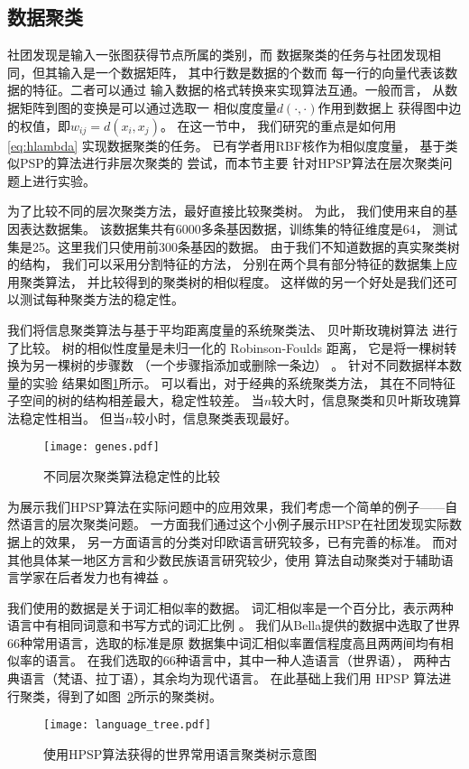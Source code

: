 \subsection{数据聚类}
\label{sec:data_clustering}
社团发现是输入一张图获得节点所属的类别，而
数据聚类的任务与社团发现相同，但其输入是一个数据矩阵，
其中行数是数据的个数而
每一行的向量代表该数据的特征。二者可以通过
输入数据的格式转换来实现算法互通。一般而言，
从数据矩阵到图的变换是可以通过选取一
相似度度量$d(\cdot,\cdot)$作用到数据上
获得图中边的权值，即$w_{ij}=d(x_i, x_j)$。
在这一节中，
我们研究的重点是如何用
\eqref{eq:hlambda} 实现数据聚类的任务。
已有学者用RBF核作为相似度度量，
基于类似PSP的算法进行非层次聚类的
尝试\cite{mac}，而本节主要
针对HPSP算法在层次聚类问题上进行实验。

为了比较不同的层次聚类方法，最好直接比较聚类树。
为此，
我们使用来自\citet{khan2001classification}的基因表达数据集。
该数据集共有6000多条基因数据，训练集的特征维度是64，
测试集是25。这里我们只使用前300条基因的数据。
由于我们不知道数据的真实聚类树的结构，
我们可以采用分割特征的方法，
分别在两个具有部分特征的数据集上应用聚类算法，
并比较得到的聚类树的相似程度。
这样做的另一个好处是我们还可以测试每种聚类方法的稳定性。

我们将信息聚类算法与基于平均距离度量的系统聚类法、
贝叶斯玫瑰树算法
\cite{blundell2011discovering}
进行了比较。
树的相似性度量是未归一化的 Robinson-Foulds 距离，
它是将一棵树转换为另一棵树的步骤数
（一个步骤指添加或删除一条边）
\citep{day1985optimal}。
针对不同数据样本数量的实验
结果如图\ref{fig:shc}所示。
可以看出，对于经典的系统聚类方法，
其在不同特征子空间的树的结构相差最大，稳定性较差。
当$n$较大时，信息聚类和贝叶斯玫瑰算法稳定性相当。
但当$n$较小时，信息聚类表现最好。

\begin{figure}[!ht]
\centering
\texttt{[image: genes.pdf]}
\caption{不同层次聚类算法稳定性的比较}\label{fig:shc}
\end{figure}

为展示我们HPSP算法在实际问题中的应用效果，我们考虑一个简单的例子——自然语言的层次聚类问题。
一方面我们通过这个小例子展示HPSP在社团发现实际数据上的效果，
另一方面语言的分类对印欧语言研究较多，已有完善的标准。 
而对其他具体某一地区方言和少数民族语言研究较少，使用
算法自动聚类对于辅助语言学家在后者发力也有裨益 \cite{nasution2019visualizing}。

我们使用的数据是关于词汇相似率的数据。
词汇相似率是一个百分比，表示两种语言中有相同词意和书写方式的词汇比例
\cite{bella2021database}。
我们从Bella提供的数据中选取了世界66种常用语言，选取的标准是原
数据集中词汇相似率置信程度高且两两间均有相似率的语言。
在我们选取的66种语言中，其中一种人造语言（世界语），
两种古典语言（梵语、拉丁语），其余均为现代语言。
在此基础上我们用 HPSP 算法进行聚类，得到了如图~\ref{fig:language_tree}所示的聚类树。
\begin{figure}[!ht]
    \centering
    \texttt{[image: language\_tree.pdf]}
    \caption{使用HPSP算法获得的世界常用语言聚类树示意图}\label{fig:language_tree}
\end{figure}

